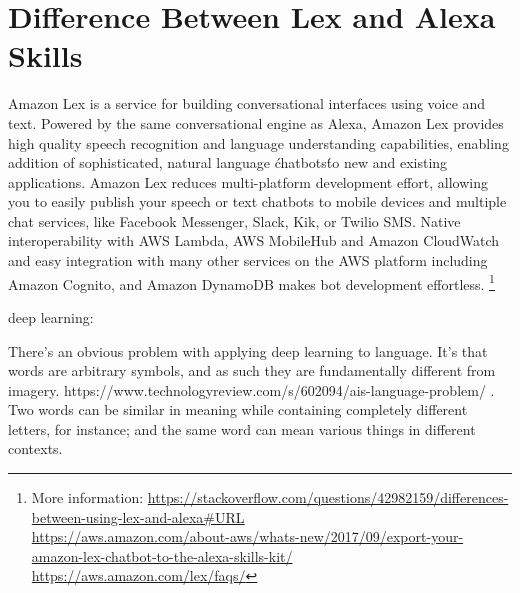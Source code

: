 \section*{Difference Between Lex and Alexa Skills}
\label{lexAlexa}  

Amazon Lex is a service for building conversational interfaces using voice and text. Powered by the same conversational engine as Alexa, Amazon Lex provides high quality speech recognition and language understanding capabilities, enabling addition of sophisticated, natural language \'chatbots\' to new and existing applications. Amazon Lex reduces multi-platform development effort, allowing you to easily publish your speech or text chatbots to mobile devices and multiple chat services, like Facebook Messenger, Slack, Kik, or Twilio SMS. Native interoperability with AWS Lambda, AWS MobileHub and Amazon CloudWatch and easy integration with many other services on the AWS platform including Amazon Cognito, and Amazon DynamoDB makes bot development effortless. \footnote{
More information: \url{https://stackoverflow.com/questions/42982159/differences-between-using-lex-and-alexa\#URL}\\
\url{https://aws.amazon.com/about-aws/whats-new/2017/09/export-your-amazon-lex-chatbot-to-the-alexa-skills-kit/}\\
\url{https://aws.amazon.com/lex/faqs/}
}












deep learning:

There’s an obvious problem with applying deep learning to language. It’s that words are arbitrary symbols, and as such they are fundamentally different from imagery.
https://www.technologyreview.com/s/602094/ais-language-problem/
. Two words can be similar in meaning while containing completely different letters, for instance; and the same word can mean various things in different contexts.








\clearpage

